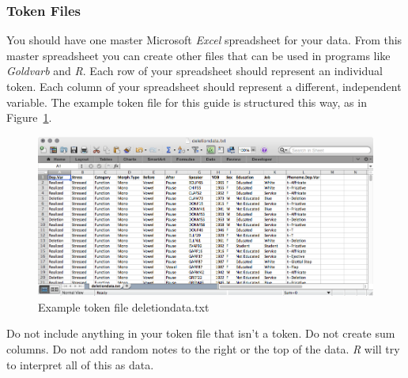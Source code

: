 \documentclass[
  10pt,
  letterpaper]{article}
\renewcommand\texttt[1]{{\ttfamily\color{BrickRed}#1}}
\begin{document}
\hypertarget{token-files}{%
\subsubsection{Token Files}\label{token-files}}

You should have one master Microsoft \emph{Excel} spreadsheet for your
data. From this master spreadsheet you can create other files that can
be used in programs like \emph{Goldvarb} and \emph{R}. Each row of your
spreadsheet should represent an individual token. Each column of your
spreadsheet should represent a different, independent variable. The
example token file for this guide is structured this way, as in
Figure~\ref{fig-excel}.

\begin{figure}

{\centering \includegraphics{images/tokenfile.png}

}

\caption{\label{fig-excel}Example token file \texttt{deletiondata.txt}}

\end{figure}

\begin{tcolorbox}[enhanced jigsaw, coltitle=black, colframe=quarto-callout-warning-color-frame, leftrule=.75mm, bottomtitle=1mm, arc=.35mm, opacitybacktitle=0.6, title=\textcolor{quarto-callout-warning-color}{\faExclamationTriangle}\hspace{0.5em}{Warning}, colbacktitle=quarto-callout-warning-color!10!white, breakable, left=2mm, titlerule=0mm, colback=white, toptitle=1mm, rightrule=.15mm, bottomrule=.15mm, toprule=.15mm, opacityback=0]
Do not include anything in your token file that isn't a token. Do not
create sum columns. Do not add random notes to the right or the top of
the data. \emph{R} will try to interpret all of this as data.
\end{tcolorbox}
\end{document}
